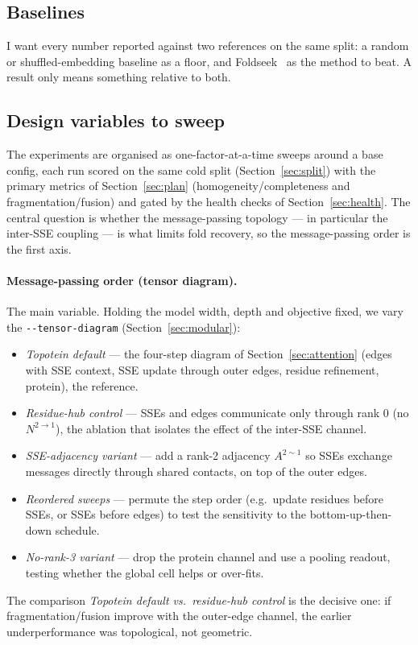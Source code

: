 \documentclass[11pt,a4paper]{article}
\theoremstyle{definition}
\begin{document}
\subsection{Baselines}

I want every number reported against two references on the same split: a random
or shuffled-embedding baseline as a floor, and Foldseek~\cite{foldseek} as the
method to beat. A result only means something relative to both.

\subsection{Design variables to sweep}
\label{sec:sweep}

The experiments are organised as one-factor-at-a-time sweeps around a base config,
each run scored on the same cold split (Section~\ref{sec:split}) with the primary
metrics of Section~\ref{sec:plan} (homogeneity/completeness and
fragmentation/fusion) and gated by the health checks of Section~\ref{sec:health}.
The central question is whether the message-passing topology --- in particular the
inter-SSE coupling --- is what limits fold recovery, so the message-passing order is
the first axis.

\paragraph{Message-passing order (tensor diagram).} The main variable. Holding the
model width, depth and objective fixed, we vary the \texttt{-{}-tensor-diagram}
(Section~\ref{sec:modular}):
\begin{itemize}[leftmargin=1.4em,itemsep=1pt]
\item \emph{Topotein default} --- the four-step diagram of Section~\ref{sec:attention}
      (edges with SSE context, SSE update through outer edges, residue refinement,
      protein), the reference.
\item \emph{Residue-hub control} --- SSEs and edges communicate only through rank 0
      (no $N^{2\to1}$), the ablation that isolates the effect of the inter-SSE
      channel.
\item \emph{SSE-adjacency variant} --- add a rank-2 adjacency $A^{2\sim1}$ so SSEs
      exchange messages directly through shared contacts, on top of the outer edges.
\item \emph{Reordered sweeps} --- permute the step order (e.g.\ update residues
      before SSEs, or SSEs before edges) to test the sensitivity to the
      bottom-up-then-down schedule.
\item \emph{No-rank-3 variant} --- drop the protein channel and use a pooling
      readout, testing whether the global cell helps or over-fits.
\end{itemize}
The comparison \emph{Topotein default vs.\ residue-hub control} is the decisive one:
if fragmentation/fusion improve with the outer-edge channel, the earlier
underperformance was topological, not geometric.
\end{document}
